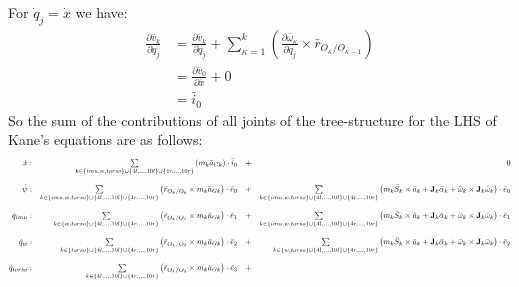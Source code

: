 \documentclass[a4paper,10pt]{article}
\newcommand\scalemath[2]{\scalebox{#1}{\mbox{\ensuremath{\displaystyle #2}}}}
\begin{document}
For $\dot{q}_j = \dot{x}$ we have:
\begin{align}
 \frac{\partial \bar{v}_k}{\partial \dot{q}_j} &= \frac{\partial \bar{v}_k}{\partial \dot{q}_j} + \sum\limits_{\kappa=1}^k \left( \frac{\partial \bar\omega_\kappa}{\partial \dot{q}_j} \times \bar{r}_{O_\kappa/O_{\kappa-1}} \right) \nonumber \\
 &=  \frac{\partial \bar{v}_0}{\partial \dot{x}} + 0 \nonumber \\
 &=  \bar{i}_0 
\end{align}
So the sum of the contributions of all joints of the tree-structure for the LHS of Kane's equations are as follows:
\begin{align}\scalemath{0.6}{
 \begin{matrix*}[r] 
  \dot{x}: & \sum\limits_{k \in \{ imu,w,torso \} \cup \{ 4l,...,10l \} \cup \{ 4r,...,10r \}} \left(m_k \bar{a}_{Gk}\right) \cdot \bar{i}_0 & + & 0 \\ \\
  \dot{\psi}: & \sum\limits_{k \in \{ imu,w,torso \} \cup \{ 4l,...,10l \} \cup \{ 4r,...,10r \}} \left(\bar{r}_{O_k/O_0} \times m_k \bar{a}_{Gk}\right) \cdot \bar{e}_0 & + & 
  \sum\limits_{k \in \{ imu,w,torso \} \cup \{ 4l,...,10l \} \cup \{ 4r,...,10r \}} \left( m_k \bar{S}_k \times \bar{a}_k + \mathbf{J}_{k} \bar{\alpha}_k + \bar{\omega}_k \times \mathbf{J}_{k} \bar{\omega}_k\right) \cdot  \bar{e}_0\\ \\
  \dot{q}_{imu}: & \sum\limits_{k \in \{ w,torso \} \cup \{ 4l,...,10l \} \cup \{ 4r,...,10r \}} \left(\bar{r}_{O_k/O_1} \times m_k \bar{a}_{Gk}\right) \cdot \bar{e}_1 & + & 
  \sum\limits_{k \in \{ imu,w,torso \} \cup \{ 4l,...,10l \} \cup \{ 4r,...,10r \}} \left( m_k \bar{S}_k \times \bar{a}_k + \mathbf{J}_{k} \bar{\alpha}_k + \bar{\omega}_k \times \mathbf{J}_{k} \bar{\omega}_k\right) \cdot  \bar{e}_1\\ \\
  \dot{q}_{w}: & \sum\limits_{k \in \{ torso \} \cup \{ 4l,...,10l \} \cup \{ 4r,...,10r \}} \left(\bar{r}_{O_k/O_2} \times m_k \bar{a}_{Gk}\right) \cdot \bar{e}_2 & + & 
  \sum\limits_{k \in \{ w,torso \} \cup \{ 4l,...,10l \} \cup \{ 4r,...,10r \}} \left( m_k \bar{S}_k \times \bar{a}_k + \mathbf{J}_{k} \bar{\alpha}_k + \bar{\omega}_k \times \mathbf{J}_{k} \bar{\omega}_k\right) \cdot  \bar{e}_2\\ \\
  \dot{q}_{torso}: & \sum\limits_{k \in \{ 4l,...,10l \} \cup \{ 4r,...,10r \}} \left(\bar{r}_{O_k/O_3} \times m_k \bar{a}_{Gk}\right) \cdot \bar{e}_3 & + & 

\end{matrix*}}
\end{align}
\end{document}
